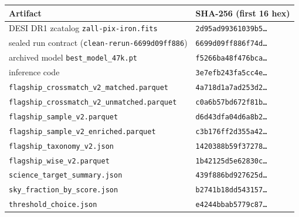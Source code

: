 \begin{ruledtabular}
\begin{tabular}{l l}
Artifact & SHA-256 (first 16 hex) \\
\hline
DESI DR1 zcatalog \texttt{zall-pix-iron.fits} & \texttt{2d95ad99361039b5\ldots} \\
sealed run contract (\texttt{clean-rerun-6699d09ff886}) & \texttt{6699d09ff886f74d\ldots} \\
archived model \texttt{best\_model\_47k.pt} & \texttt{f5266ba48f476bca\ldots} \\
inference code & \texttt{3e7efb243fa5cc4e\ldots} \\
\texttt{flagship\_crossmatch\_v2\_matched.parquet} & \texttt{4a718d1a7ad253d2\ldots} \\
\texttt{flagship\_crossmatch\_v2\_unmatched.parquet} & \texttt{c0a6b57bd672f81b\ldots} \\
\texttt{flagship\_sample\_v2.parquet} & \texttt{d6d43dfa04d6a8b2\ldots} \\
\texttt{flagship\_sample\_v2\_enriched.parquet} & \texttt{c3b176ff2d355a42\ldots} \\
\texttt{flagship\_taxonomy\_v2.json} & \texttt{1420388b59f37278\ldots} \\
\texttt{flagship\_wise\_v2.parquet} & \texttt{1b42125d5e62830c\ldots} \\
\texttt{science\_target\_summary.json} & \texttt{439f886bd927625d\ldots} \\
\texttt{sky\_fraction\_by\_score.json} & \texttt{b2741b18dd543157\ldots} \\
\texttt{threshold\_choice.json} & \texttt{e4244bbab5779c87\ldots} \\
\end{tabular}
\end{ruledtabular}
